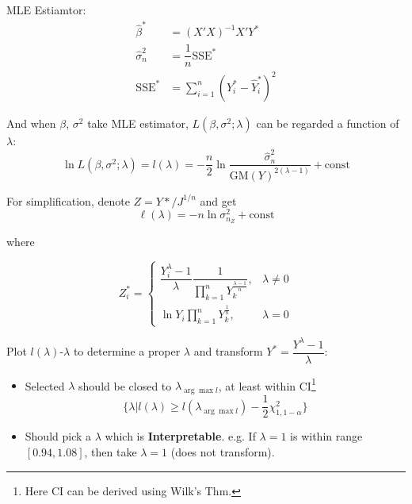 \begin{itemize}[topsep=2pt,itemsep=2pt]
            
    
            MLE Estiamtor:
            \begin{align*}
                \hat{\beta }^*&= (X'X)^{-1}X'Y^*\\
                \hat{\sigma }^2_n&=\dfrac{1}{n}\mathrm{SSE}^*\\
                \mathrm{SSE}^*&=\sum_{i=1}^n(Y_i^*-\hat{Y}_i^*)^2
            \end{align*}
    
            And when $ \beta  $, $ \sigma ^2 $ take MLE estimator, $ L(\beta ,\sigma ^2;\lambda ) $ can be regarded a function of $ \lambda  $:
            \begin{equation}
                \ln L(\beta ,\sigma ^2;\lambda )=l(\lambda )=-\dfrac{n}{2}\ln \dfrac{\hat{\sigma}^2_n}{\mathrm{GM}(Y)^{2(\lambda -1)}}+\mathrm{const}
            \end{equation}
    
            For simplification, denote $ Z=Y*/J^{1/n} $ and get
            \begin{equation}
                \ell (\lambda )=-n\ln \sigma^2_{n_Z}+\mathrm{const} 
            \end{equation}
            
            where 
    
            \begin{equation}
                Z_i^* =\begin{cases}
                    \dfrac{Y_i^\lambda-1 }{\lambda }\dfrac{1}{\prod\limits_{k=1}^n Y_k^{\frac{\lambda -1}{n}}},&\lambda \neq 0\\
                    \ln Y_i\prod\limits_{k=1}^n Y_k^{\frac{1}{n}},&\lambda =0
                \end{cases}
            \end{equation}
    
            Plot $ l(\lambda ) $-$ \lambda  $ to determine a proper $ \lambda  $ and transform $ Y^*=\dfrac{Y^\lambda -1}{\lambda } $:
            \begin{itemize}[topsep=2pt,itemsep=2pt]
                \item Selected $ \lambda $ should be closed to $ \lambda_{\arg\max l} $, at least within CI\footnote{Here CI can be derived using Wilk's Thm.}
                \begin{equation}
                    \{\lambda |l(\lambda )\geq l(\lambda_{\arg\max l})-\dfrac{1}{2}\chi^2_{1,1-\alpha }\}
                \end{equation}
                \item Should pick a $ \lambda  $ which is \textbf{Interpretable}. e.g. If $ \lambda =1 $ is within range $ [0.94,1.08] $, then take $ \lambda =1 $ (does not transform).
                

\end{itemize}
\end{itemize}

